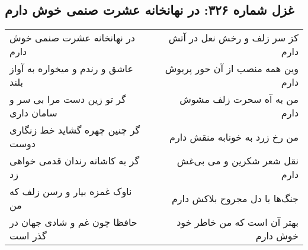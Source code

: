 \begin{center}
\section*{غزل شماره ۳۲۶: در نهانخانه عشرت صنمی خوش دارم}
\label{sec:sh326}
\begin{longtable}{l p{0.5cm} r}
در نهانخانه عشرت صنمی خوش دارم
&&
کز سر زلف و رخش نعل در آتش دارم
\\
عاشق و رندم و میخواره به آواز بلند
&&
وین همه منصب از آن حور پریوش دارم
\\
گر تو زین دست مرا بی سر و سامان داری
&&
من به آه سحرت زلف مشوش دارم
\\
گر چنین چهره گشاید خط زنگاری دوست
&&
من رخ زرد به خونابه منقش دارم
\\
گر به کاشانه رندان قدمی خواهی زد
&&
نقل شعر شکرین و می بی‌غش دارم
\\
ناوک غمزه بیار و رسن زلف که من
&&
جنگ‌ها با دل مجروح بلاکش دارم
\\
حافظا چون غم و شادی جهان در گذر است
&&
بهتر آن است که من خاطر خود خوش دارم
\\
\end{longtable}
\end{center}
